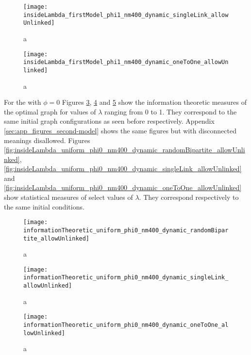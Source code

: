 \begin{figure}
  \centering
  \texttt{[image: insideLambda\_firstModel\_phi1\_nm400\_dynamic\_singleLink\_allowUnlinked]}
  \caption{a}
  \label{fig:insideLambda_firstModel_phi1_nm400_dynamic_singleLink_allowUnlinked}
\end{figure}

\begin{figure}
  \centering
  \texttt{[image: insideLambda\_firstModel\_phi1\_nm400\_dynamic\_oneToOne\_allowUnlinked]}
  \caption{a}
  \label{fig:insideLambda_firstModel_phi1_nm400_dynamic_oneToOne_allowUnlinked}
\end{figure}

For the \secondmodel{} with $\phi=0$ Figures  \ref{fig:informationTheoretic_uniform_phi0_nm400_dynamic_randomBipartite_allowUnlinked},  \ref{fig:informationTheoretic_uniform_phi0_nm400_dynamic_singleLink_allowUnlinked} and  \ref{fig:informationTheoretic_uniform_phi0_nm400_dynamic_oneToOne_allowUnlinked} show the information theoretic measures of the optimal graph for values of $\lambda$ ranging from 0 to 1.
They correspond to the same initial graph configurations as seen before respectively.
Appendix \ref{sec:app_figures_second-model} shows the same figures but with disconnected meanings disallowed.
Figures \ref{fig:insideLambda_uniform_phi0_nm400_dynamic_randomBipartite_allowUnlinked}, \ref{fig:insideLambda_uniform_phi0_nm400_dynamic_singleLink_allowUnlinked} and \ref{fig:insideLambda_uniform_phi0_nm400_dynamic_oneToOne_allowUnlinked} show statistical measures of select values of $\lambda$.
They correspond respectively to the same initial conditions.

\begin{figure}
  \centering
  \texttt{[image: informationTheoretic\_uniform\_phi0\_nm400\_dynamic\_randomBipartite\_allowUnlinked]}
  \caption{a}
  \label{fig:informationTheoretic_uniform_phi0_nm400_dynamic_randomBipartite_allowUnlinked}
\end{figure}

\begin{figure}
  \centering
  \texttt{[image: informationTheoretic\_uniform\_phi0\_nm400\_dynamic\_singleLink\_allowUnlinked]}
  \caption{a}
  \label{fig:informationTheoretic_uniform_phi0_nm400_dynamic_singleLink_allowUnlinked}
\end{figure}

\begin{figure}
  \centering
  \texttt{[image: informationTheoretic\_uniform\_phi0\_nm400\_dynamic\_oneToOne\_allowUnlinked]}
  \caption{a}
  \label{fig:informationTheoretic_uniform_phi0_nm400_dynamic_oneToOne_allowUnlinked}
\end{figure}

